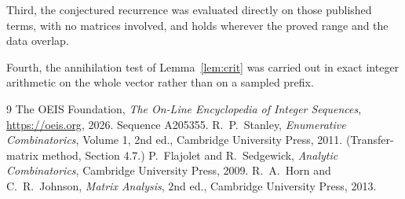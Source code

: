 \documentclass[11pt,a4paper]{article}
\theoremstyle{plain}
\theoremstyle{definition}
\begin{document}
Third, the conjectured recurrence was evaluated directly on those published terms, with no
matrices involved, and holds wherever the proved range and the data overlap.

Fourth, the annihilation test of Lemma~\ref{lem:crit} was carried out in exact integer
arithmetic on the whole vector rather than on a sampled prefix.

\begin{thebibliography}{9}
 The OEIS Foundation, \emph{The On-Line Encyclopedia of Integer
Sequences}, \url{https://oeis.org}, 2026. Sequence A205355.
 R.~P.~Stanley, \emph{Enumerative Combinatorics}, Volume 1, 2nd ed.,
Cambridge University Press, 2011. (Transfer-matrix method, Section 4.7.)
 P.~Flajolet and R.~Sedgewick, \emph{Analytic Combinatorics}, Cambridge
University Press, 2009.
 R.~A.~Horn and C.~R.~Johnson, \emph{Matrix Analysis}, 2nd ed., Cambridge
University Press, 2013.
\end{thebibliography}
\end{document}
